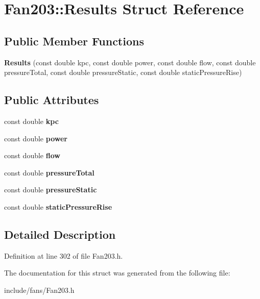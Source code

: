 \hypertarget{struct_fan203_1_1_results}{}\section{Fan203\+:\+:Results Struct Reference}
\label{struct_fan203_1_1_results}
\subsection*{Public Member Functions}
\begin{DoxyCompactItemize}
\item 
\mbox{\label{struct_fan203_1_1_results_ab8d6607214bd63c0dfc8fda57c0783d8}} 
{\bfseries Results} (const double kpc, const double power, const double flow, const double pressure\+Total, const double pressure\+Static, const double static\+Pressure\+Rise)
\end{DoxyCompactItemize}
\subsection*{Public Attributes}
\begin{DoxyCompactItemize}
\item 
\mbox{\label{struct_fan203_1_1_results_af7807d80fca26d0b285bc64724955bef}} 
const double {\bfseries kpc}
\item 
\mbox{\label{struct_fan203_1_1_results_a9349844e20eff206f02af8966e2e5fac}} 
const double {\bfseries power}
\item 
\mbox{\label{struct_fan203_1_1_results_ac33d08fec0aca62c54453533afd56138}} 
const double {\bfseries flow}
\item 
\mbox{\label{struct_fan203_1_1_results_a1badf6a2ca70b8a8e5b5a8434bd616cd}} 
const double {\bfseries pressure\+Total}
\item 
\mbox{\label{struct_fan203_1_1_results_aafd803a2134247f32b4da2f6c456e003}} 
const double {\bfseries pressure\+Static}
\item 
\mbox{\label{struct_fan203_1_1_results_a78f134ec5411707138395bfd17e2f34e}} 
const double {\bfseries static\+Pressure\+Rise}
\end{DoxyCompactItemize}


\subsection{Detailed Description}


Definition at line 302 of file Fan203.\+h.



The documentation for this struct was generated from the following file\+:\begin{DoxyCompactItemize}
\item 
include/fans/Fan203.\+h\end{DoxyCompactItemize}

